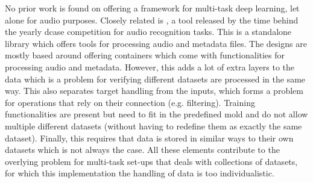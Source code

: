 No prior work is found on offering a framework for multi-task deep learning, let alone for audio purposes. Closely related is \cite{dcase-repo_2021}, a tool released by the time behind the yearly dcase \cite{dcase} competition for audio recognition tasks. This is a standalone library which offers tools for processing audio and metadata files. The designs are mostly based around offering containers which come with functionalities for processing audio and metadata. However, this adds a lot of extra layers to the data which is a problem for verifying different datasets are processed in the same way. This also separates target handling from the inputs, which forms a problem for operations that rely on their connection (e.g. filtering). Training functionalities are present but need to fit in the predefined mold and do not allow multiple different datasets (without having to redefine them as exactly the same dataset). Finally, this requires that data is stored in similar ways to their own datasets which is not always the case. All these elements contribute to the overlying problem for multi-task set-ups that deals with collections of datasets, for which this implementation the handling of data is too individualistic. \\



